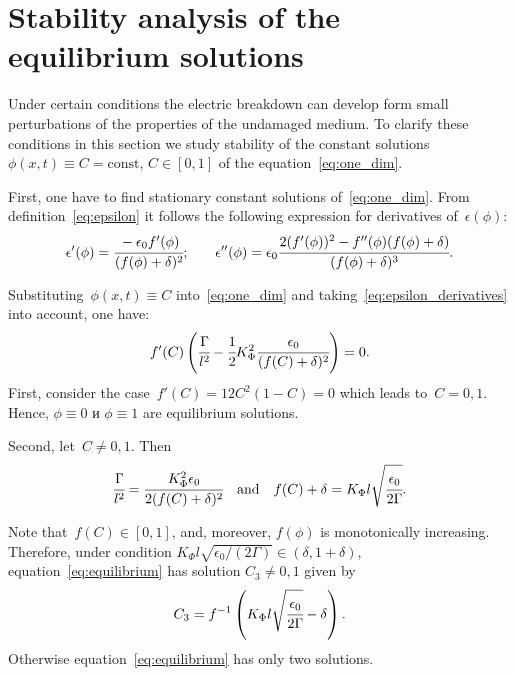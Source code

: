 
\section{Stability analysis of the equilibrium solutions}
\label{sec:theoretical_analysis}

Under certain conditions the electric breakdown can develop
form small perturbations of the properties of the undamaged medium.
To clarify these conditions in this section we study
stability of the constant solutions~$\phi(x, t) \equiv C = \text{const}$, $C \in [0, 1]$
of the equation~\eqref{eq:one_dim}.

First, one have to find stationary constant solutions of~\eqref{eq:one_dim}.
From definition~\eqref{eq:epsilon} it follows the following expression for derivatives
of~$\epsilon(\phi)$:
\begin{equation}
	\epsilon'(\phi) = \cfrac{-\epsilon_0 f'(\phi)}{(f(\phi) + \delta)^2} {\text{;}} \qquad \epsilon''(\phi) = \epsilon_0 \cfrac{2 (f'(\phi))^2 - f''(\phi)(f(\phi) + \delta)}{(f(\phi) + \delta)^3} {\text{.}}
	\label{eq:epsilon_derivatives}
\end{equation}

Substituting~$\phi(x, t) \equiv C$ into~\eqref{eq:one_dim} and
taking~\eqref{eq:epsilon_derivatives} into account, one have:
\begin{equation}
	f'(C) \left( \cfrac{\Gamma}{l^2} - \cfrac{1}{2} K_\Phi^2 \cfrac{\epsilon_0}{(f(C) + \delta)^2} \right) = 0 {\text{.}}
	\label{eq:equilibrium}
\end{equation}
First, consider the case~$f'(C) = 12C^2 (1 - C) = 0$
which leads to~$C = 0,1$. Hence, $\phi \equiv 0$ и $\phi \equiv 1$ are
equilibrium solutions.

Second, let~$C \neq 0, 1$. Then
\[
\cfrac{\Gamma}{l^2} = \cfrac{K_\Phi^2 \epsilon_0}{2 (f(C) + \delta)^2}
\quad \text{and} \quad
f(C) + \delta = K_\Phi l \sqrt{\cfrac{\epsilon_0}{2 \Gamma}}.
\]

Note that~$f(C) \in [0, 1]$, and, moreover, $f(\phi)$ is monotonically
increasing. Therefore, under condition $K_\Phi l \sqrt{\epsilon_0 / (2
  \Gamma)} \in (\delta, 1 + \delta)$,
equation~\eqref{eq:equilibrium} has solution $C_3\ne 0,1$ given by
\begin{equation}
	C_3 = f^{-1} \left( K_\Phi l \sqrt{\cfrac{\epsilon_0}{2 \Gamma}} - \delta \right) {\text{.}}
	\label{eq:equilibrium_third}
\end{equation}
Otherwise equation~\eqref{eq:equilibrium} has only two solutions.

